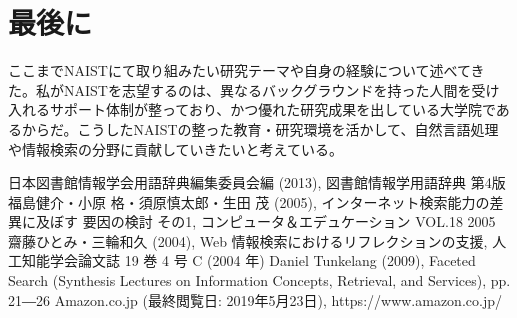 \documentclass[a4j,10pt, twocolumn]{jarticle} \usepackage[dvipdfmx]{graphicx} \usepackage{amssymb} \usepackage{amsmath}
\begin{document}
\section{最後に}
ここまでNAISTにて取り組みたい研究テーマや自身の経験について述べてきた。私がNAISTを志望するのは、異なるバックグラウンドを持った人間を受け入れるサポート体制が整っており、かつ優れた研究成果を出している大学院であるからだ。こうしたNAISTの整った教育・研究環境を活かして、自然言語処理や情報検索の分野に貢献していきたいと考えている。

\begin{thebibliography}{9}
  日本図書館情報学会用語辞典編集委員会編 (2013), 図書館情報学用語辞典 第4版
   福島健介・小原 格・須原慎太郎・生田 茂 (2005), インターネット検索能力の差異に及ぼす 要因の検討 その1, コンピュータ＆エデュケーション VOL.18 2005
   齋藤ひとみ・三輪和久 (2004),  Web 情報検索におけるリフレクションの支援, 人工知能学会論文誌 19 巻 4 号 C (2004 年)
  Daniel Tunkelang (2009), Faceted Search (Synthesis Lectures on Information Concepts, Retrieval, and Services), pp. 21―26
  Amazon.co.jp (最終閲覧日: 2019年5月23日), https://www.amazon.co.jp/
\end{thebibliography}
\end{document}
